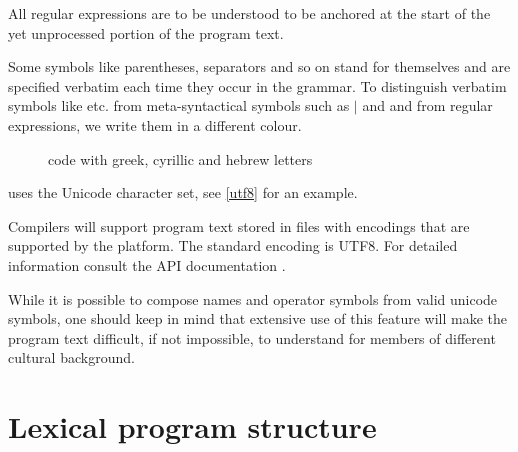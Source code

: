 All regular expressions are to be understood to be anchored at the start of the yet unprocessed portion of the program text.

\par Some symbols like parentheses, separators and so on stand for themselves and are specified verbatim each time they occur in the grammar. To distinguish verbatim symbols like \sym{<- , ; ::} etc. from meta-syntactical symbols such as {\Large $|$} and  and from regular expressions, we write them in a different colour.

\begin{figure}[bth]
\epsfxsize\hsize {}
\caption{\frege{} code with greek, cyrillic and hebrew letters}
\label{utf8}
\end{figure}

\par \frege{} uses the Unicode character set, see \autoref{utf8} for an
example. 

Compilers will support program text stored in files with encodings
that are supported by the \java{} platform. The standard encoding is UTF8.
For detailed information consult the \java{}
API documentation \cite{apidoc}. 

While it is possible to compose names and operator symbols from
valid unicode symbols, one should keep in mind that extensive use of
this feature will make the program text
difficult, if not impossible, to understand for members of different
cultural background.

\section{Lexical program structure}

\begin{flushleft}
 \\
  \\
 \\
  \oder {} \oder {} \oder {} \oder {} \oder {}
\\\hspace{0.5in} \oder {} \oder {}
\end{flushleft}

